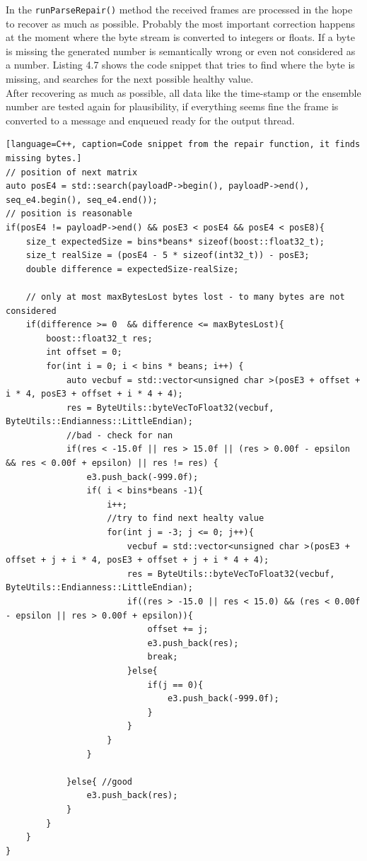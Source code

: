 In the \texttt{runParseRepair()} method the received frames are processed in the hope to recover as much as possible. Probably the most important correction happens at the moment where the byte stream is converted to integers or floats. If a byte is missing the generated number is semantically wrong or even not considered as a number. Listing 4.7 shows the code snippet that tries to find where the byte is missing, and searches for the next possible healthy value.\\
After recovering as much as possible, all data like the time-stamp or the ensemble number are tested again for plausibility, if everything seems fine the frame is converted to a message and enqueued ready for the output thread.
\begin{lstlisting}[language=C++, caption=Code snippet from the repair function, it finds missing bytes.]
// position of next matrix
auto posE4 = std::search(payloadP->begin(), payloadP->end(), seq_e4.begin(), seq_e4.end());
// position is reasonable
if(posE4 != payloadP->end() && posE3 < posE4 && posE4 < posE8){
    size_t expectedSize = bins*beans* sizeof(boost::float32_t);
    size_t realSize = (posE4 - 5 * sizeof(int32_t)) - posE3;
    double difference = expectedSize-realSize;

    // only at most maxBytesLost bytes lost - to many bytes are not considered
    if(difference >= 0  && difference <= maxBytesLost){
        boost::float32_t res;
        int offset = 0;
        for(int i = 0; i < bins * beans; i++) {
            auto vecbuf = std::vector<unsigned char >(posE3 + offset + i * 4, posE3 + offset + i * 4 + 4);
            res = ByteUtils::byteVecToFloat32(vecbuf, ByteUtils::Endianness::LittleEndian);
            //bad - check for nan
            if(res < -15.0f || res > 15.0f || (res > 0.00f - epsilon && res < 0.00f + epsilon) || res != res) {
                e3.push_back(-999.0f);
                if( i < bins*beans -1){
                    i++;
                    //try to find next healty value
                    for(int j = -3; j <= 0; j++){
                        vecbuf = std::vector<unsigned char >(posE3 + offset + j + i * 4, posE3 + offset + j + i * 4 + 4);
                        res = ByteUtils::byteVecToFloat32(vecbuf, ByteUtils::Endianness::LittleEndian);
                        if((res > -15.0 || res < 15.0) && (res < 0.00f - epsilon || res > 0.00f + epsilon)){
                            offset += j;
                            e3.push_back(res);
                            break;
                        }else{
                            if(j == 0){
                                e3.push_back(-999.0f);
                            }
                        }
                    }
                }

            }else{ //good
                e3.push_back(res);
            }
        }
    }
}
\end{lstlisting}

